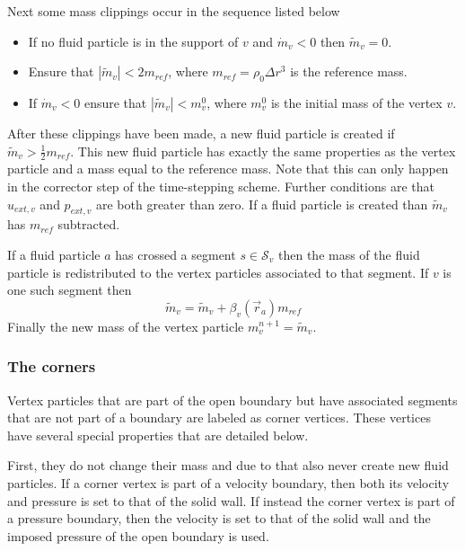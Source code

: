 \documentclass{../GPUSPHtemplate}
\begin{document}
Next some mass clippings occur in the sequence listed below
\begin{itemize}
\item If no fluid particle is in the support of $v$ and $\dot{m}_v < 0$
then $\widetilde{m}_v = 0$.
\item Ensure that $|\widetilde{m}_v| < 2 m_{ref}$, where $m_{ref} =
\rho_0 \Delta r^3$ is the reference mass.
\item If $\dot{m}_v < 0$ ensure that $|\widetilde{m}_v| < m^0_v$,
where $m^0_v$ is the initial mass of the vertex $v$.
\end{itemize}
After these clippings have been made, a new fluid particle is created if
$\widetilde{m}_v > \frac{1}{2}m_{ref}$. This new fluid particle has
exactly the same properties as the vertex particle and a mass equal to
the reference mass. Note that this can only happen in the corrector step
of the time-stepping scheme. Further conditions are that $u_{ext,v}$ and
$p_{ext,v}$ are both greater than zero. If a fluid particle is created
than $\widetilde{m}_v$ has $m_{ref}$ subtracted.

If a fluid particle $a$ has crossed a segment $s \in \mathcal{S}_v$ then
the mass of the fluid particle is redistributed to the vertex particles
associated to that segment. If $v$ is one such segment then
\begin{equation}
\widetilde{m}_v = \widetilde{m}_v + \beta_v(\vec{r}_a) m_{ref}
\label{e:open:splitfluid}
\end{equation}
Finally the new mass of the vertex particle $m^{n+1}_v =
\widetilde{m}_v$.

\subsubsection{The corners}
Vertex particles that are part of the open boundary but have associated
segments that are not part of a boundary are labeled as corner vertices.
These vertices have several special properties that are detailed below.

First, they do not change their mass and due to that also never create
new fluid particles. If a corner vertex is part of a velocity boundary,
then both its velocity and pressure is set to that of the solid wall.
If instead the corner vertex is part of a pressure boundary, then the
velocity is set to that of the solid wall and the imposed pressure of
the open boundary is used.
\end{document}
